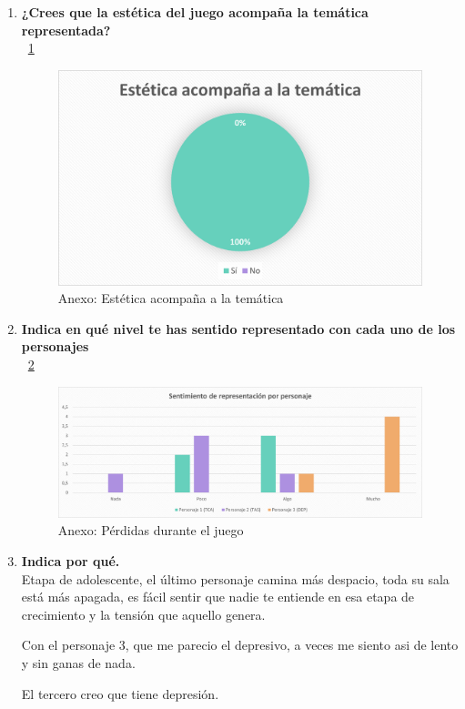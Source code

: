 \documentclass[12pt, a4paper,twoside,titlepage]{book}
\begin{document}
\begin{enumerate}[label=\textbf{\arabic*}.]
		
	 \item \textbf{¿Crees que la estética del juego acompaña la temática representada?}\\
	~\ref{fig:anexEstetic}
	\begin{figure}
		\centering
		\includegraphics[width=.8\linewidth]{Anexo Demo/7AnexDemo_estetic}
		\caption{Anexo: Estética acompaña a la temática}
		\label{fig:anexEstetic}
	\end{figure}
	
	 \item \textbf{Indica en qué nivel te has sentido representado con cada uno de los personajes}\\
	 ~\ref{fig:anexRepre}
	 \begin{figure}
	 	\centering
	 	\includegraphics[width=.8\linewidth]{Anexo Demo/8AnexDemo_repres}
	 	\caption{Anexo: Pérdidas durante el juego}
	 	\label{fig:anexRepre}
	 \end{figure}
	 
	 \item \textbf{Indica por qué.}\\	 
		 Etapa de adolescente, el último personaje camina más despacio, toda su sala está más apagada, es fácil sentir que nadie te entiende en esa etapa de crecimiento y la tensión que aquello genera.
		 
		 Con el personaje 3, que me parecio el depresivo, a veces me siento asi de lento y sin ganas de nada.
		 
		 El tercero creo que tiene depresión.
		 

\end{enumerate}
\end{document}
